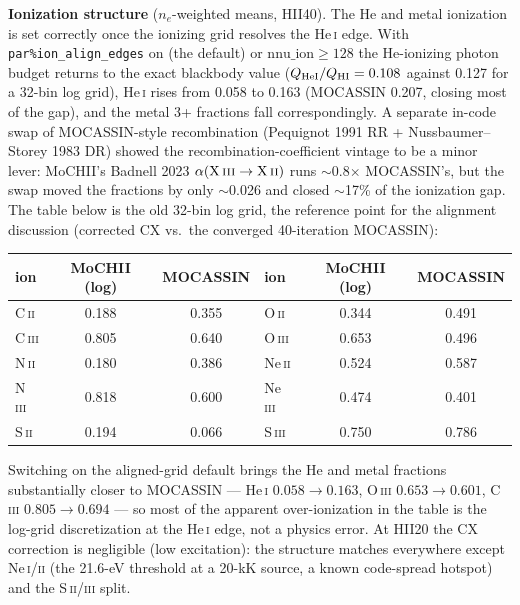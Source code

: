 \documentclass[english,a4paper]{my_memo}
\newcommand{\code}[1]{\texttt{#1}}
\begin{document}
\textbf{Ionization structure} ($n_e$-weighted means, HII40).  The He and
metal ionization is set correctly once the ionizing grid resolves the
He\,\textsc{i} edge.  With \code{par\%ion\_align\_edges} on (the default)
or $\mathrm{nnu\_ion} \geq 128$ the He-ionizing photon budget returns to
the exact blackbody value ($Q_{\rm HeI}/Q_{\rm HI} = 0.108$ against 0.127
for a 32-bin log grid), He\,\textsc{i} rises from 0.058 to 0.163
(MOCASSIN 0.207, closing most of the gap), and the metal 3+ fractions
fall correspondingly.  A separate in-code swap of MOCASSIN-style
recombination (Pequignot 1991 RR + Nussbaumer--Storey 1983 DR) showed the
recombination-coefficient vintage to be a minor lever: MoCHII's Badnell
2023 $\alpha(\mathrm{X\,\textsc{iii}}\to\mathrm{X\,\textsc{ii}})$ runs
$\sim$0.8$\times$ MOCASSIN's, but the swap moved the fractions by only
$\sim$0.026 and closed $\sim$17\% of the ionization gap.  The table below
is the old 32-bin log grid, the reference point for the alignment
discussion (corrected CX vs.\ the converged 40-iteration MOCASSIN):

\begin{center}\small
\begin{tabular}{lcc@{\qquad}lcc}
\toprule
ion & MoCHII (log) & MOCASSIN & ion & MoCHII (log) & MOCASSIN\\
\midrule
C\,\textsc{ii}   & 0.188 & 0.355 & O\,\textsc{ii}  & 0.344 & 0.491 \\
C\,\textsc{iii}  & 0.805 & 0.640 & O\,\textsc{iii} & 0.653 & 0.496 \\
N\,\textsc{ii}   & 0.180 & 0.386 & Ne\,\textsc{ii} & 0.524 & 0.587 \\
N\,\textsc{iii}  & 0.818 & 0.600 & Ne\,\textsc{iii}& 0.474 & 0.401 \\
S\,\textsc{ii}   & 0.194 & 0.066 & S\,\textsc{iii} & 0.750 & 0.786 \\
\bottomrule
\end{tabular}
\end{center}
Switching on the aligned-grid default brings the He and metal fractions
substantially closer to MOCASSIN --- He\,\textsc{i} $0.058 \to 0.163$,
O\,\textsc{iii} $0.653 \to 0.601$, C\,\textsc{iii} $0.805 \to 0.694$ ---
so most of the apparent over-ionization in the table is the log-grid
discretization at the He\,\textsc{i} edge, not a physics error.  At HII20
the CX correction is negligible (low excitation): the structure matches
everywhere except Ne\,\textsc{i}/\textsc{ii} (the 21.6-eV threshold at a
20-kK source, a known code-spread hotspot) and the
S\,\textsc{ii}/\textsc{iii} split.
\end{document}

